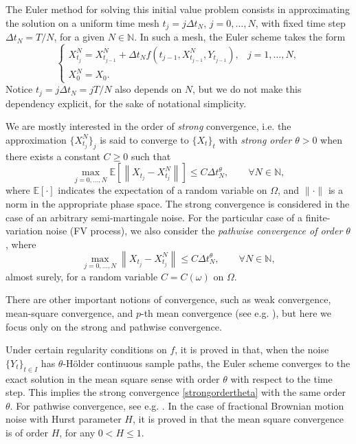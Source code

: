 \documentclass[reqno,12pt]{amsart}
\theoremstyle{plain} %
\theoremstyle{definition} %
\begin{document}
The Euler method for solving this initial value problem consists in approximating the solution on a uniform time mesh $t_j = j\Delta t_N$, $j = 0, \ldots, N$, with fixed time step $\Delta t_N = T/N$, for a given $N\in \mathbb{N}$. In such a mesh, the Euler scheme takes the form
\begin{equation}
  \label{emscheme}
  \begin{cases}
    X_{t_j}^N = X_{t_{j-1}}^N + \Delta t_N f(t_{j-1}, X_{t_{j-1}}^N, Y_{t_{j-1}}), & j = 1, \ldots, N, \\
    X_0^N = X_0.
  \end{cases}
\end{equation}
Notice $t_j = j\Delta t_N = jT/N$ also depends on $N$, but we do not make this dependency explicit, for the sake of notational simplicity.

We are mostly interested in the order of \emph{strong} convergence, i.e. the approximation $\{X_{t_j}^N\}_j$ is said to converge to $\{X_t\}_t$ with \emph{strong order $\theta>0$} when there exists a constant $C \geq 0$ such that
\begin{equation}
    \label{strongordertheta}
    \max_{j=0, \ldots, N}\mathbb{E}\left[ \left\| X_{t_j} - X_{t_j}^N \right\| \right] \leq C \Delta t_N^\theta, \qquad \forall N \in \mathbb{N},
\end{equation}
where $\mathbb{E}[\cdot]$ indicates the expectation of a random variable on $\Omega$, and $\|\cdot\|$ is a norm in the appropriate phase space. The strong convergence is considered in the case of an arbitrary semi-martingale noise. For the particular case of a finite-variation noise (FV process), we also consider the \emph{pathwise convergence of order $\theta$}, where  
\begin{equation}
    \label{pathwiseordertheta}
    \max_{j=0, \ldots, N}\left\| X_{t_j} - X_{t_j}^N \right\| \leq C \Delta t_N^\theta, \qquad \forall N \in \mathbb{N},
\end{equation}
almost surely, for a random variable $C=C(\omega)$ on $\Omega$.

There are other important notions of convergence, such as weak convergence, mean-square convergence, and $p$-th mean convergence (see e.g. \cite{HanKloeden2017,HighamKloeden2021, JentzenKloeden2011}), but here we focus only on the strong and pathwise convergence.

Under certain regularity conditions on $f$, it is proved in \cite[Theorem 3]{WangCaoHanKloeden2021} that, when the noise $\{Y_t\}_{t\in I}$ has $\theta$-H\"older continuous sample paths, the Euler scheme converges to the exact solution in the mean square sense with order $\theta$ with respect to the time step. This implies the strong convergence \eqref{strongordertheta} with the same order $\theta$. For pathwise convergence, see e.g. \cite{GruneKloeden2001,KloedenJentzen2007,JentzenKloeden2011,AsaiKloeden2016,HanKloeden2017}. In the case of fractional Brownian motion noise with Hurst parameter $H$, it is proved in \cite[Theorem 2]{WangCaoHanKloeden2021} that the mean square convergence is of order $H$, for any $0 < H \leq 1.$
\end{document}
